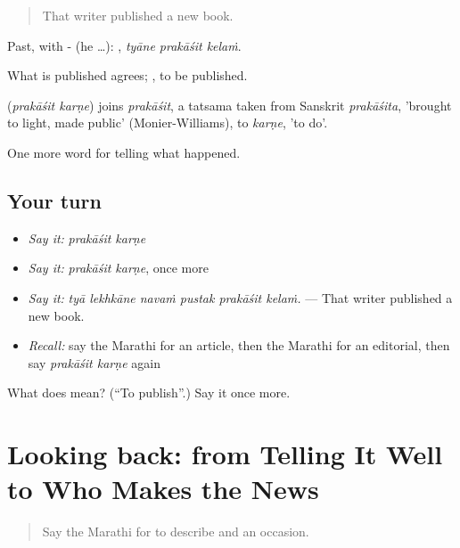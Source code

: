 \begin{quote}
That writer published a new book.
\end{quote}

Past, with - (he …):   , \emph{tyāne prakāśit kelaṁ}.

What is published agrees;  , to be published.

\begin{cousinweb}
\textbf{ } (\emph{prakāśit karṇe}) joins \emph{prakāśit}, a tatsama taken from Sanskrit \emph{prakāśita}, 'brought to light, made public' (Monier-Williams), to \emph{karṇe}, 'to do'.
\end{cousinweb}

\begin{grammarlens}[title={What you've built}]
One more word for telling what happened.
\end{grammarlens}

\subsection*{Your turn}
\begin{itemize}
\raggedright
  \item \emph{Say it:} \emph{prakāśit karṇe}
  \item \emph{Say it:} \emph{prakāśit karṇe}, once more
  \item \emph{Say it:} \emph{tyā lekhkāne navaṁ pustak prakāśit kelaṁ.} — That writer published a new book.
  \item \emph{Recall:} say the Marathi for an article, then the Marathi for an editorial, then say \emph{prakāśit karṇe} again
\end{itemize}

\begin{tcolorbox}[breakable,colback=teal!4,colframe=teal!35!black,title={Before you move on}]
What does   mean? (\textquotedblleft{}To publish\textquotedblright{}.) Say it once more.
\end{tcolorbox}
\section[(dialogue)]{Looking back: from Telling It Well to Who Makes the News}

\label{lesson:MR-R311-review-304-311}



\begin{quote}
Say the Marathi for to describe and an occasion.
\end{quote}

